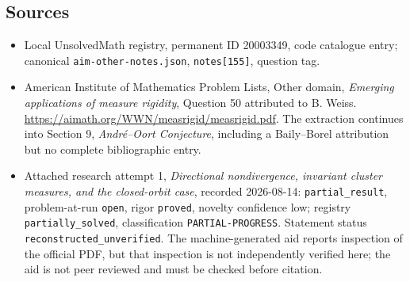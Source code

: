 \documentclass[11pt]{article}
\begin{document}
\subsection{Sources}
\begin{itemize}\item Local UnsolvedMath registry, permanent ID 20003349, code catalogue entry; canonical \texttt{aim-other-notes.json}, \texttt{notes[155]}, question tag.\item American Institute of Mathematics Problem Lists, Other domain, \emph{Emerging applications of measure rigidity}, Question 50 attributed to B. Weiss. \url{https://aimath.org/WWN/measrigid/measrigid.pdf}. The extraction continues into Section 9, \emph{Andr\'e--Oort Conjecture}, including a Baily--Borel attribution but no complete bibliographic entry.\item Attached research attempt 1, \emph{Directional nondivergence, invariant cluster measures, and the closed-orbit case}, recorded 2026-08-14: \texttt{partial\_result}, problem-at-run \texttt{open}, rigor \texttt{proved}, novelty confidence low; registry \texttt{partially\_solved}, classification \texttt{PARTIAL-PROGRESS}. Statement status \texttt{reconstructed\_unverified}. The machine-generated aid reports inspection of the official PDF, but that inspection is not independently verified here; the aid is not peer reviewed and must be checked before citation.\end{itemize}
\end{document}
